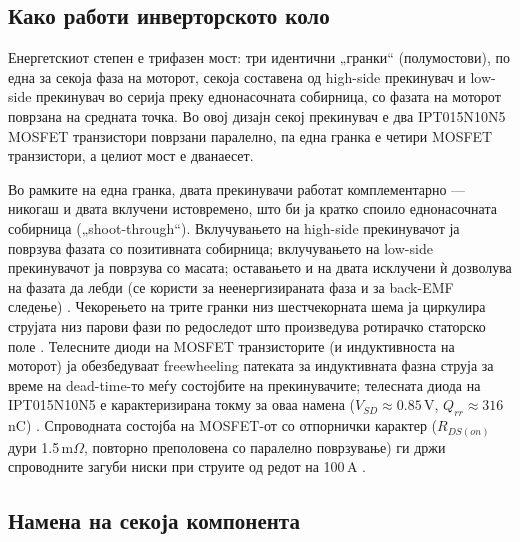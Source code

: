 \documentclass[11pt,a4paper]{article}
\newcommand{\eng}[1]{\textenglish{#1}}
\begin{document}
\subsection{Како работи инверторското коло}

Енергетскиот степен е трифазен мост: три идентични „гранки“ (полумостови), по една за секоја фаза на моторот, секоја составена од \eng{high-side} прекинувач и \eng{low-side} прекинувач во серија преку еднонасочната собирница, со фазата на моторот поврзана на средната точка. Во овој дизајн секој прекинувач е два IPT015N10N5 MOSFET транзистори поврзани паралелно, па една гранка е четири MOSFET транзистори, а целиот мост е дванаесет.

Во рамките на една гранка, двата прекинувачи работат комплементарно --- никогаш и двата вклучени истовремено, што би ја кратко споило еднонасочната собирница („\eng{shoot-through}“). Вклучувањето на \eng{high-side} прекинувачот ја поврзува фазата со позитивната собирница; вклучувањето на \eng{low-side} прекинувачот ја поврзува со масата; оставањето и на двата исклучени ѝ дозволува на фазата да лебди (се користи за неенергизираната фаза и за \eng{back-EMF} следење) \cite{ref10,ref11}. Чекорењето на трите гранки низ шестчекорната шема ја циркулира струјата низ парови фази по редоследот што произведува ротирачко статорско поле \cite{ref10}. Телесните диоди на MOSFET транзисторите (и индуктивноста на моторот) ја обезбедуваат \eng{freewheeling} патеката за индуктивната фазна струја за време на \eng{dead-time}-то меѓу состојбите на прекинувачите; телесната диода на IPT015N10N5 е карактеризирана токму за оваа намена ($V_{SD}\approx 0.85$\,V, $Q_{rr}\approx 316$\,nC) \cite{ref1}. Спроводната состојба на MOSFET-от со отпорнички карактер ($R_{DS(on)}$ дури 1.5\,m$\Omega$, повторно преполовена со паралелно поврзување) ги држи спроводните загуби ниски при струите од редот на 100\,A \cite{ref1,ref5}.

\subsection{Намена на секоја компонента}
\end{document}
